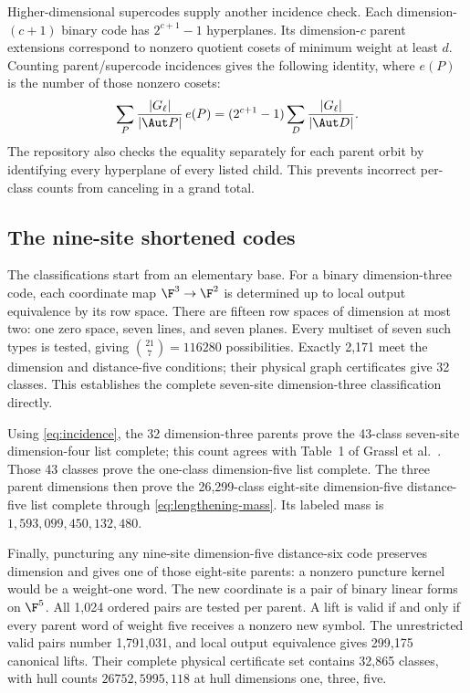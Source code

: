 Higher-dimensional supercodes supply another incidence check. Each
dimension-\((c+1)\) binary code has \(2^{c+1}-1\) hyperplanes.
Its dimension-\(c\) parent extensions correspond to nonzero quotient
cosets of minimum weight at least \(d\). Counting parent/supercode
incidences gives the following identity, where \(e(P)\) is the number
of those nonzero cosets:
\begin{equation}\label{eq:incidence}
 \sum_P\frac{|G_\ell|}{|\Aut P|}\,e(P)
 =(2^{c+1}-1)\sum_D\frac{|G_\ell|}{|\Aut D|}.
\end{equation}
The repository also checks the equality separately for each parent orbit
by identifying every hyperplane of every listed child. This prevents
incorrect per-class counts from canceling in a grand total.

\subsection{The nine-site shortened codes}\label{sec:nine-site}

The classifications start from an elementary base.
For a binary dimension-three code, each coordinate map
\(\F^3\to\F^2\) is determined up to local output equivalence by its
row space. There are fifteen row spaces of dimension at most two:
one zero space, seven lines, and seven planes.
Every multiset of seven such types is tested, giving
\(\binom{21}{7}=116280\) possibilities. Exactly 2,171 meet the
dimension and distance-five conditions; their physical graph certificates
give 32 classes. This establishes the complete seven-site dimension-three
classification directly.

Using \eqref{eq:incidence}, the 32 dimension-three parents prove the
43-class seven-site dimension-four list complete; this count agrees with
Table~1 of Grassl et al.\ \cite{dodeca}. Those 43 classes prove the
one-class dimension-five list complete. The three parent dimensions
then prove the 26,299-class eight-site dimension-five distance-five list
complete through \eqref{eq:lengthening-mass}. Its labeled mass is
\(1,593,099,450,132,480\).

Finally, puncturing any nine-site dimension-five distance-six code
preserves dimension and gives one of those eight-site parents: a
nonzero puncture kernel would be a weight-one word. The new coordinate
is a pair of binary linear forms on \(\F^5\). All 1,024 ordered pairs
are tested per parent. A lift is valid if and only if every parent word
of weight five receives a nonzero new symbol. The unrestricted valid
pairs number 1,791,031, and local output equivalence gives 299,175
canonical lifts. Their complete physical certificate set contains
32,865 classes, with hull counts \(26752,5995,118\) at hull dimensions
one, three, five.

